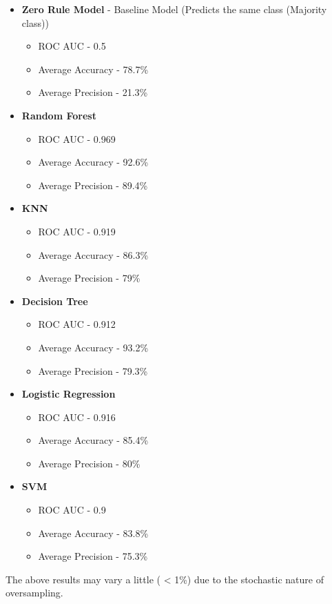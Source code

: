 \documentclass[10pt,twocolumn,letterpaper]{article}
\begin{document}
\begin{itemize}
    \item  \textbf{Zero Rule Model} - Baseline Model (Predicts the same class (Majority class))
	\begin{itemize}
	\item{ROC AUC - 0.5}
	\item{Average Accuracy - 78.7\%}
	\item{Average Precision - 21.3\%}
	\end{itemize}
    \item  \textbf{Random Forest}
	\begin{itemize}
	\item{ROC AUC - 0.969}
	\item{Average Accuracy - 92.6\%}
	\item{Average Precision - 89.4\%}
	\end{itemize}
    \item  \textbf{KNN} 
	\begin{itemize}
	\item{ROC AUC - 0.919}
	\item{Average Accuracy - 86.3\%}
	\item{Average Precision - 79\%}
	\end{itemize}
    \item  \textbf{Decision Tree} 
	\begin{itemize}
	\item{ROC AUC - 0.912}
	\item{Average Accuracy - 93.2\%}
	\item{Average Precision - 79.3\%}
	\end{itemize}
    \item  \textbf{Logistic Regression} 
	\begin{itemize}
	\item{ROC AUC - 0.916}
	\item{Average Accuracy - 85.4\%}
	\item{Average Precision - 80\%}
	\end{itemize}
    \item  \textbf{SVM} 
	\begin{itemize}
	\item{ROC AUC - 0.9}
	\item{Average Accuracy - 83.8\%}
	\item{Average Precision - 75.3\%}
	\end{itemize}
\end{itemize}

The above results may vary a little ( < 1\%) due to the stochastic nature of oversampling.
\end{document}
